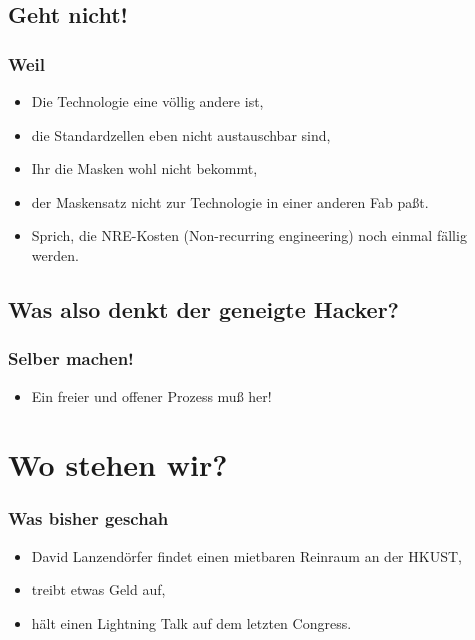 \documentclass{beamer}
\begin{document}

\subsection{Geht nicht!}

\begin{frame}
\frametitle{Weil}
\begin{itemize}
\item Die Technologie eine völlig andere ist,
\item die Standardzellen eben nicht austauschbar sind,
\item Ihr die Masken wohl nicht bekommt,
\item der Maskensatz nicht zur Technologie in einer anderen Fab paßt.
\item Sprich, die NRE-Kosten (Non-recurring engineering) noch einmal fällig werden.
\end{itemize}
\end{frame}


\subsection{Was also denkt der geneigte Hacker?}
\begin{frame}
\frametitle{Selber machen!}
\begin{itemize}
\item Ein freier und offener Prozess muß her!
\end{itemize}
\end{frame}

\section{Wo stehen wir?}

\begin{frame}
\frametitle{Was bisher geschah}
\begin{itemize}
\item David Lanzendörfer findet einen mietbaren Reinraum an der HKUST,
\item treibt etwas Geld auf,
\item hält einen Lightning Talk auf dem letzten Congress.
\end{itemize}
\end{frame}
\end{document}
